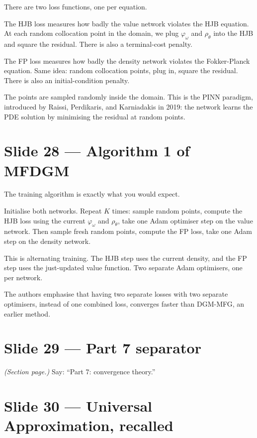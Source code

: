 \documentclass[11pt]{article}
\begin{document}
There are two loss functions, one per equation.

The HJB loss measures how badly the value network violates the HJB equation.
At each random collocation point in the domain, we plug $\varphi_\omega$
and $\rho_\theta$ into the HJB and square the residual. There is also a
terminal-cost penalty.

The FP loss measures how badly the density network violates the
Fokker-Planck equation. Same idea: random collocation points, plug in,
square the residual. There is also an initial-condition penalty.

The points are sampled randomly inside the domain. This is the PINN
paradigm, introduced by Raissi, Perdikaris, and Karniadakis in 2019: the
network learns the PDE solution by minimising the residual at random points.

\section*{Slide 28 --- Algorithm 1 of MFDGM}

The training algorithm is exactly what you would expect.

Initialise both networks. Repeat $K$ times: sample random points, compute
the HJB loss using the current $\varphi_\omega$ and $\rho_\theta$, take one
Adam optimiser step on the value network. Then sample fresh random points,
compute the FP loss, take one Adam step on the density network.

This is alternating training. The HJB step uses the current density, and
the FP step uses the just-updated value function. Two separate Adam
optimisers, one per network.

The authors emphasise that having two separate losses with two separate
optimisers, instead of one combined loss, converges faster than DGM-MFG, an
earlier method.

\section*{Slide 29 --- Part 7 separator}

\textit{(Section page.)}  Say: ``Part 7: convergence theory.''

\section*{Slide 30 --- Universal Approximation, recalled}
\end{document}
